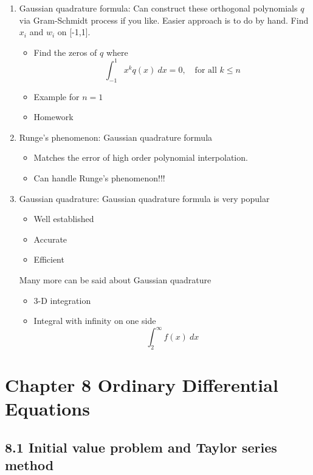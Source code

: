 \documentclass{article}
\theoremstyle{remark}
\begin{document}
\begin{enumerate}
\item Gaussian quadrature formula: Can construct these orthogonal polynomials $q$ via Gram-Schmidt process if you like. Easier approach is to do by hand.
Find $x_i$ and $w_i$ on [-1,1].
\begin{itemize}
\item Find the zeros of $q$ where
$$
\int_{-1}^1x^kq(x) ~dx = 0 ,\quad\text{for all $k\leq n$}
$$
\item Example for $n=1$
\item Homework
\end{itemize}

\item Runge's phenomenon:
Gaussian quadrature formula
\begin{itemize}
\item Matches the error of high order polynomial interpolation.
\item Can handle Runge's phenomenon!!!
\end{itemize}

\item Gaussian quadrature: 
Gaussian quadrature formula is very popular
\begin{itemize}
\item Well established
\item Accurate
\item Efficient
\end{itemize}
Many more can be said about Gaussian quadrature
\begin{itemize}
\item 3-D integration
\item Integral with infinity on one side
$$
\int_2^\infty f(x)~dx
$$
\end{itemize}
\end{enumerate}


\section{Chapter 8 Ordinary Differential Equations}

\subsection{8.1 Initial value problem and Taylor series method}
\end{document}
